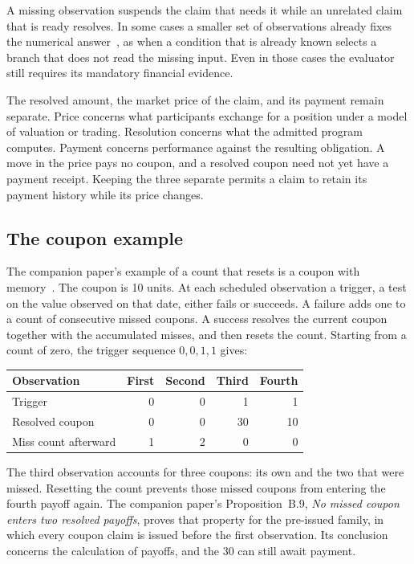 \documentclass{momentum}
\begin{document}
A missing observation suspends the claim that needs it while an unrelated claim that is ready resolves. In some cases a smaller set of observations already fixes the numerical answer~\cite[Section~4.4]{claim}, as when a condition that is already known selects a branch that does not read the missing input. Even in those cases the evaluator still requires its mandatory financial evidence.

The resolved amount, the market price of the claim, and its payment remain separate. Price concerns what participants exchange for a position under a model of valuation or trading. Resolution concerns what the admitted program computes. Payment concerns performance against the resulting obligation. A move in the price pays no coupon, and a resolved coupon need not yet have a payment receipt. Keeping the three separate permits a claim to retain its payment history while its price changes.

\subsection{The coupon example}
\label{sec:conditions-coupon}

The companion paper's example of a count that resets is a coupon with memory~\cite[Sections~2.2 and~3]{claim}. The coupon is 10 units. At each scheduled observation a trigger, a test on the value observed on that date, either fails or succeeds. A failure adds one to a count of consecutive missed coupons. A success resolves the current coupon together with the accumulated misses, and then resets the count. Starting from a count of zero, the trigger sequence $0,0,1,1$ gives:

\begin{center}
\begin{tabular}{@{}lrrrr@{}}
\toprule
Observation & First & Second & Third & Fourth \\
\midrule
Trigger & 0 & 0 & 1 & 1 \\
Resolved coupon & 0 & 0 & 30 & 10 \\
Miss count afterward & 1 & 2 & 0 & 0 \\
\bottomrule
\end{tabular}
\end{center}

The third observation accounts for three coupons: its own and the two that were missed. Resetting the count prevents those missed coupons from entering the fourth payoff again. The companion paper's Proposition~B.9, \emph{No missed coupon enters two resolved payoffs}, proves that property for the pre-issued family, in which every coupon claim is issued before the first observation. Its conclusion concerns the calculation of payoffs, and the 30 can still await payment.
\end{document}
